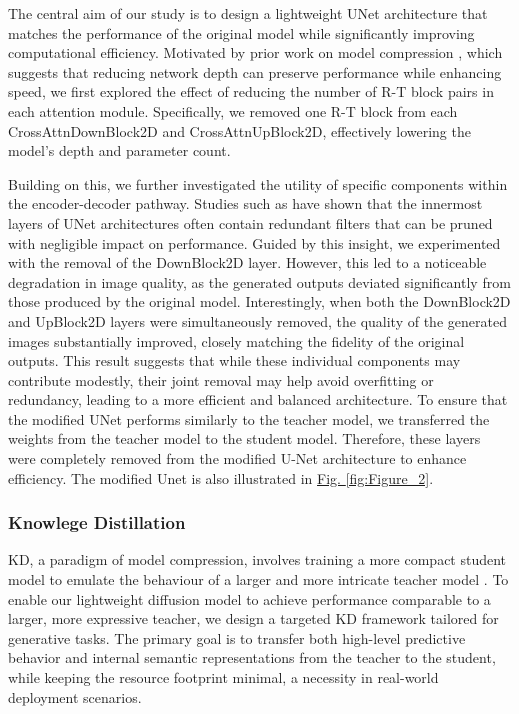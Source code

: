 \documentclass[a4paper,fleqn]{ieeetj}
\begin{document}
The central aim of our study is to design a lightweight UNet architecture that matches the performance of the original model while significantly improving computational efficiency. Motivated by prior work on model compression \cite{sanh2019distilbert}, which suggests that reducing network depth can preserve performance while enhancing speed, we first explored the effect of reducing the number of R-T block pairs in each attention module. Specifically, we removed one R-T block from each CrossAttnDownBlock2D and CrossAttnUpBlock2D, effectively lowering the model’s depth and parameter count.

Building on this, we further investigated the utility of specific components within the encoder-decoder pathway. Studies such as \cite{kim2023bk, kim2022cut} have shown that the innermost layers of UNet architectures often contain redundant filters that can be pruned with negligible impact on performance. Guided by this insight, we experimented with the removal of the DownBlock2D layer. However, this led to a noticeable degradation in image quality, as the generated outputs deviated significantly from those produced by the original model. Interestingly, when both the DownBlock2D and UpBlock2D layers were simultaneously removed, the quality of the generated images substantially improved, closely matching the fidelity of the original outputs. This result suggests that while these individual components may contribute modestly, their joint removal may help avoid overfitting or redundancy, leading to a more efficient and balanced architecture. To ensure that the modified UNet performs similarly to the teacher model, we transferred the weights from the teacher model to the student model. Therefore, these layers were completely removed from the modified U-Net architecture to enhance efficiency. The modified Unet is also illustrated in \hyperref[fig:Figure_2]{Fig. \ref*{fig:Figure_2}}.

\subsubsection{Knowlege Distillation}
KD, a paradigm of model compression, involves training a more compact student model to emulate the behaviour of a larger and more intricate teacher model \cite{beyer2022knowledge}. To enable our lightweight diffusion model to achieve performance comparable to a larger, more expressive teacher, we design a targeted KD framework tailored for generative tasks. The primary goal is to transfer both high-level predictive behavior and internal semantic representations from the teacher to the student, while keeping the resource footprint minimal, a necessity in real-world deployment scenarios.
\end{document}
